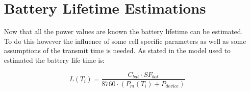 \section{Battery Lifetime Estimations}

Now that all the power values are known the battery lifetime can be estimated. To do this however the influence of some cell specific parameters as well as some assumptions of the transmit time is needed. As stated in  the model used to estimated the battery life time is:

\begin{equation}
L(T_i) = \frac{C_{bat}\cdot SF_{bat}}{8760\cdot (P_m(T_i) + P_{device})}
\end{equation}
\begin{where}
\end{where}

